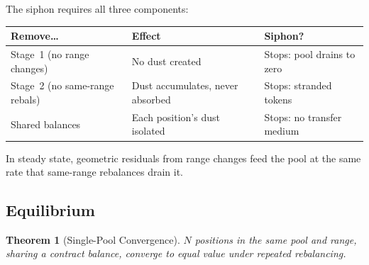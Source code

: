 \documentclass[11pt,a4paper]{article}
\newtheorem{theorem}{Theorem}
\begin{document}
The siphon requires all three components:

\begin{table}[H]
\centering
\small
\begin{tabular}{@{}lll@{}}
\toprule
Remove\ldots & Effect & Siphon? \\
\midrule
Stage~1 (no range changes) & No dust created & Stops: pool drains to zero \\
Stage~2 (no same-range rebals) & Dust accumulates, never absorbed & Stops: stranded tokens \\
Shared balances & Each position's dust isolated & Stops: no transfer medium \\
\bottomrule
\end{tabular}
\normalsize
\end{table}

In steady state, geometric residuals from range changes feed the pool at the same rate that same-range rebalances drain it.

\subsection{Equilibrium}\label{sec:equilibrium}

\begin{theorem}[Single-Pool Convergence]\label{thm:convergence}
$N$ positions in the same pool and range, sharing a contract balance, converge to equal value under repeated rebalancing.
\end{theorem}
\end{document}
